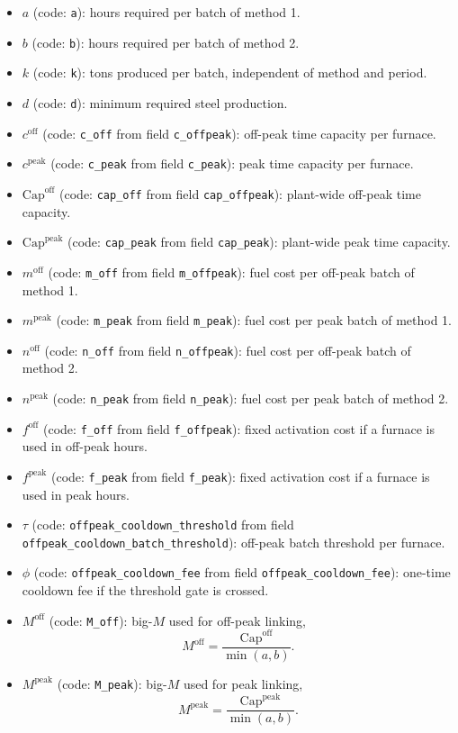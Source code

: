 \begin{itemize}
    \item $a$ (code: \texttt{a}): hours required per batch of method 1.
    \item $b$ (code: \texttt{b}): hours required per batch of method 2.
    \item $k$ (code: \texttt{k}): tons produced per batch, independent of method and period.
    \item $d$ (code: \texttt{d}): minimum required steel production.
    \item $c^{\text{off}}$ (code: \texttt{c\_off} from field \texttt{c\_offpeak}): off-peak time capacity per furnace.
    \item $c^{\text{peak}}$ (code: \texttt{c\_peak} from field \texttt{c\_peak}): peak time capacity per furnace.
    \item $\mathrm{Cap}^{\text{off}}$ (code: \texttt{cap\_off} from field \texttt{cap\_offpeak}): plant-wide off-peak time capacity.
    \item $\mathrm{Cap}^{\text{peak}}$ (code: \texttt{cap\_peak} from field \texttt{cap\_peak}): plant-wide peak time capacity.
    \item $m^{\text{off}}$ (code: \texttt{m\_off} from field \texttt{m\_offpeak}): fuel cost per off-peak batch of method 1.
    \item $m^{\text{peak}}$ (code: \texttt{m\_peak} from field \texttt{m\_peak}): fuel cost per peak batch of method 1.
    \item $n^{\text{off}}$ (code: \texttt{n\_off} from field \texttt{n\_offpeak}): fuel cost per off-peak batch of method 2.
    \item $n^{\text{peak}}$ (code: \texttt{n\_peak} from field \texttt{n\_peak}): fuel cost per peak batch of method 2.
    \item $f^{\text{off}}$ (code: \texttt{f\_off} from field \texttt{f\_offpeak}): fixed activation cost if a furnace is used in off-peak hours.
    \item $f^{\text{peak}}$ (code: \texttt{f\_peak} from field \texttt{f\_peak}): fixed activation cost if a furnace is used in peak hours.
    \item $\tau$ (code: \texttt{offpeak\_cooldown\_threshold} from field \texttt{offpeak\_cooldown\_batch\_threshold}): off-peak batch threshold per furnace.
    \item $\phi$ (code: \texttt{offpeak\_cooldown\_fee} from field \texttt{offpeak\_cooldown\_fee}): one-time cooldown fee if the threshold gate is crossed.
    \item $M^{\text{off}}$ (code: \texttt{M\_off}): big-$M$ used for off-peak linking,
    \[
    M^{\text{off}}=\frac{\mathrm{Cap}^{\text{off}}}{\min(a,b)}.
    \]
    \item $M^{\text{peak}}$ (code: \texttt{M\_peak}): big-$M$ used for peak linking,
    \[
    M^{\text{peak}}=\frac{\mathrm{Cap}^{\text{peak}}}{\min(a,b)}.
    \]
\end{itemize}


